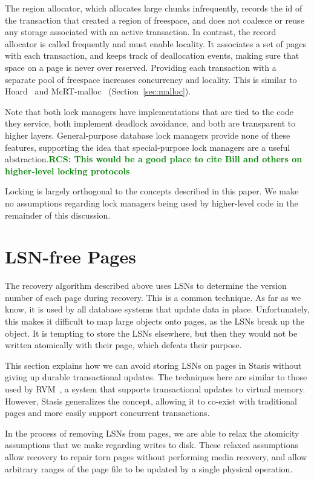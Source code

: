 \documentclass[letterpaper,twocolumn,10pt]{article}
\newcommand{\yad}{Stasis\xspace}
\newcommand{\rcs}[1]{\textcolor{green}{\bf RCS: #1}}
\begin{document}
The region allocator, which allocates large chunks infrequently, records the id
of the transaction that created a region of freespace, and does not
coalesce or reuse any storage associated with an active transaction.
In contrast, the record allocator is called frequently and must enable locality.  It associates a set of pages with
each transaction, and keeps track of deallocation events, making sure
that space on a page is never over reserved.  Providing each
transaction with a separate pool of freespace increases 
concurrency and locality.  This is 
similar to Hoard~\cite{hoard} and 
McRT-malloc~\cite{mcrt} (Section~\ref{sec:malloc}).

Note that both lock managers have implementations that are tied to the
code they service, both implement deadlock avoidance, and both are
transparent to higher layers.  General-purpose database lock managers
provide none of these features, supporting the idea that
special-purpose lock managers are a useful abstraction.\rcs{This would
be a good place to cite Bill and others on higher-level locking
protocols}

Locking is largely orthogonal to the concepts described in this paper.
We make no assumptions regarding lock managers being used by higher-level code in the remainder of this discussion.



\section{LSN-free Pages}
\label{sec:lsn-free}

The recovery algorithm described above uses LSNs to determine the
version number of each page during recovery.  This is a common
technique.  As far as we know, it is used by all database systems that
update data in place.  Unfortunately, this makes it difficult to map
large objects onto pages, as the LSNs break up the object.  It
is tempting to store the LSNs elsewhere, but then they would not be
written atomically with their page, which defeats their purpose.

This section explains how we can avoid storing LSNs on pages in \yad
without giving up durable transactional updates.  The techniques here
are similar to those used by RVM~\cite{lrvm}, a system that supports
transactional updates to virtual memory.  However, \yad generalizes
the concept, allowing it to co-exist with traditional pages and more easily
support concurrent transactions.

In the process of removing LSNs from pages, we
are able to relax the atomicity assumptions that we make regarding
writes to disk.  These relaxed assumptions allow recovery to repair
torn pages without performing media recovery, and allow arbitrary
ranges of the page file to be updated by a single physical operation.
\end{document}
